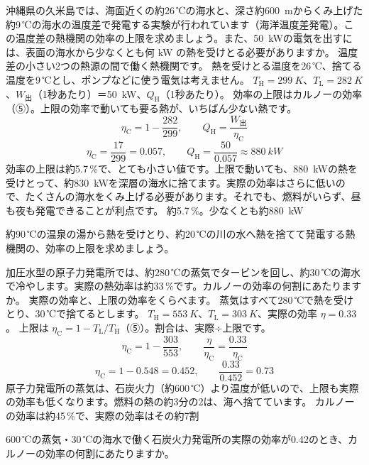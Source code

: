 \label{ph:熱-5:ex6}
\begin{phreidai}[海の温度差で発電する]
沖縄県の久米島では、海面近くの約26\,℃の海水と、深さ約\qty{600}{m}からくみ上げた約9\,℃の海水の温度差で発電する実験が行われています（海洋温度差発電）。この温度差の熱機関の効率の上限を求めましょう。また、\qty{50}{kW}の電気を出すには、表面の海水から少なくとも何 kW の熱を受けとる必要がありますか。
\phbamen
温度差の小さい2つの熱源の間で働く熱機関です。
\phmushi
熱を受けとる温度を26\,℃、捨てる温度を9\,℃とし、ポンプなどに使う電気は考えません。
\phzu
$T_{\mathrm H}=\qty{299}{K}$、$T_{\mathrm L}=\qty{282}{K}$、$W_{\text{出}}$（1秒あたり）＝\qty{50}{kW}、$Q_{\mathrm H}$（1秒あたり）。
\phriyu
効率の上限はカルノーの効率（⑤）。上限の効率で動いても要る熱が、いちばん少ない熱です。
\phtateru
\[\eta_{\mathrm C}=1-\frac{282}{299},\qquad Q_{\mathrm H}=\frac{W_{\text{出}}}{\eta_{\mathrm C}}\]
\phtoku
\[\eta_{\mathrm C}=\frac{17}{299}=0.057,\qquad Q_{\mathrm H}=\frac{50}{0.057}\approx\qty{880}{kW}\]
\phtashikame
効率の上限は約5.7\,\%で、とても小さい値です。上限で動いても、\qty{880}{kW}の熱を受けとって、約\qty{830}{kW}を深層の海水に捨てます。実際の効率はさらに低いので、たくさんの海水をくみ上げる必要があります。それでも、燃料がいらず、昼も夜も発電できることが利点です。
\kotae 約5.7\,\%。少なくとも約\qty{880}{kW}
\end{phreidai}
\begin{jibun}
約90\,℃の温泉の湯から熱を受けとり、約20\,℃の川の水へ熱を捨てて発電する熱機関の、効率の上限を求めましょう。
\end{jibun}

\label{ph:熱-5:ex7}
\begin{phreidai}[原子力発電所の効率を上限とくらべる]
加圧水型の原子力発電所では、約280\,℃の蒸気でタービンを回し、約30\,℃の海水で冷やします。実際の熱効率は約33\,\%です。カルノーの効率の何割にあたりますか。
\phbamen
実際の効率と、上限の効率をくらべます。
\phmushi
蒸気はすべて280\,℃で熱を受けとり、30\,℃で捨てるとします。
\phzu
$T_{\mathrm H}=\qty{553}{K}$、$T_{\mathrm L}=\qty{303}{K}$、実際の効率 $\eta=0.33$。
\phriyu
上限は $\eta_{\mathrm C}=1-T_{\mathrm L}/T_{\mathrm H}$（⑤）。割合は、実際÷上限です。
\phtateru
\[\eta_{\mathrm C}=1-\frac{303}{553},\qquad\frac{\eta}{\eta_{\mathrm C}}=\frac{0.33}{\eta_{\mathrm C}}\]
\phtoku
\[\eta_{\mathrm C}=1-0.548=0.452,\qquad\frac{0.33}{0.452}=0.73\]
\phtashikame
原子力発電所の蒸気は、石炭火力（約600\,℃）より温度が低いので、上限も実際の効率も低くなります。燃料の熱の約3分の2は、海へ捨てています。
\kotae カルノーの効率は約45\,\%で、実際の効率はその約7割
\end{phreidai}
\begin{jibun}
600\,℃の蒸気・30\,℃の海水で働く石炭火力発電所の実際の効率が0.42のとき、カルノーの効率の何割にあたりますか。
\end{jibun}


